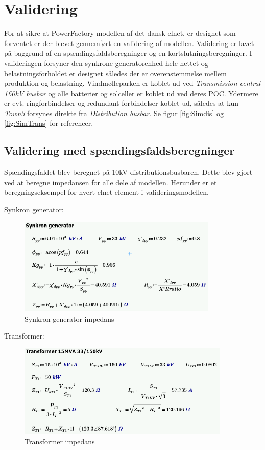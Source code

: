 
\label{Validering}
\section{Validering}

For at sikre at PowerFactory modellen af det dansk elnet, er designet som forventet er der blevet gennemført en validering af modellen. Validering er lavet på baggrund af en spændingsfaldsberegninger og en kortslutningsberegninger. I valideringen forsyner den synkrone generatorenhed hele nettet og belastningsforholdet er designet således der er overenstemmelse mellem produktion og belastning. Vindmølleparken er koblet ud ved \textit{Transmission central 160kV busbar} og alle batterier og solceller er koblet ud ved deres POC. Ydermere er evt. ringforbindelser og redundant forbindelser koblet ud, således at kun \textit{Town3} forsynes direkte fra \textit{Distribution busbar}. Se figur \ref{fig:Simdis} og \ref{fig:SimTrans} for referencer.

\subsection{Validering med spændingsfaldsberegninger}
Spændingsfaldet blev beregnet på 10kV distributionsbusbaren. Dette blev gjort ved at beregne impedansen for alle dele af modellen. Herunder er et beregningseksempel for hvert elnet element i valideringsmodellen.

Synkron generator:
\begin{figure}[H] %
	\centering
	\includegraphics[width=0.85\textwidth]{figurer/Synkron_generator_validering}
	\caption{Synkron generator impedans}
	\label{fig:SGimpedans}
\end{figure}

Transformer:
\begin{figure}[H] %
	\centering
	\includegraphics[width=0.9\textwidth]{figurer/Transformer_validering}
	\caption{Transformer impedans}
	\label{fig:Trafoimpedans}
\end{figure}

